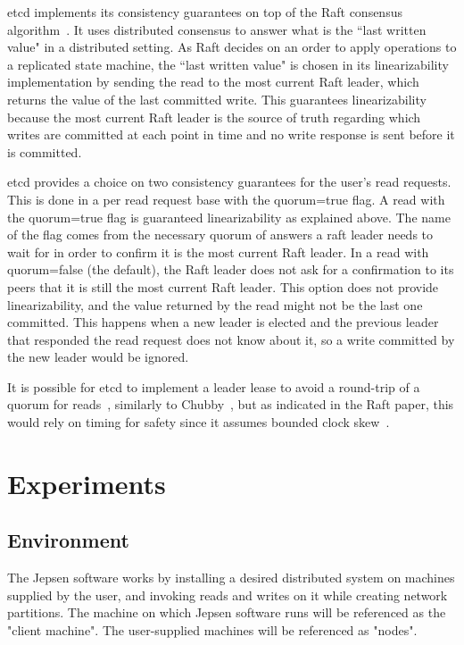 \documentclass[12pt,conference]{IEEEtran}
\begin{document}
etcd implements its consistency guarantees on top of the Raft consensus algorithm~\cite{ongaro2014search,etcdGithubWebsite}. It uses distributed consensus to answer what is the “last written value" in a distributed setting. As Raft decides on an order to apply operations to a replicated state machine, the “last written value" is chosen in its linearizability implementation by sending the read to the most current Raft leader, which returns the value of the last committed write. This guarantees linearizability because the most current Raft leader is the source of truth regarding which writes are committed at each point in time and no write response is sent before it is committed. 

etcd provides a choice on two consistency guarantees for the user's read requests. This is done in a per read request base with the quorum=true flag. A read with the quorum=true flag is guaranteed linearizability as explained above. The name of the flag comes from the necessary quorum of answers a raft leader needs to wait for in order to confirm it is the most current Raft leader. In a read with quorum=false (the default), the Raft leader does not ask for a confirmation to its peers that it is still the most current Raft leader. This option does not provide linearizability, and the value returned by the read might not be the last one committed. This happens when a new leader is elected and the previous leader that responded the read request does not know about it, so a write committed by the new leader would be ignored. 

It is possible for etcd to implement a leader lease to avoid a round-trip of a quorum for reads~\cite{gray1989leases}, similarly to Chubby~\cite{burrows2006chubby}, but as indicated in the Raft paper, this would rely on timing for safety since it assumes bounded clock skew~\cite{ongaro2014search}.

\section{Experiments}
\subsection {Environment}

The Jepsen software works by installing a desired distributed system on machines supplied by the user, and invoking reads and writes on it while creating network partitions. The machine on which Jepsen software runs will be referenced as the "client machine". The user-supplied machines will be referenced as "nodes".
\end{document}
